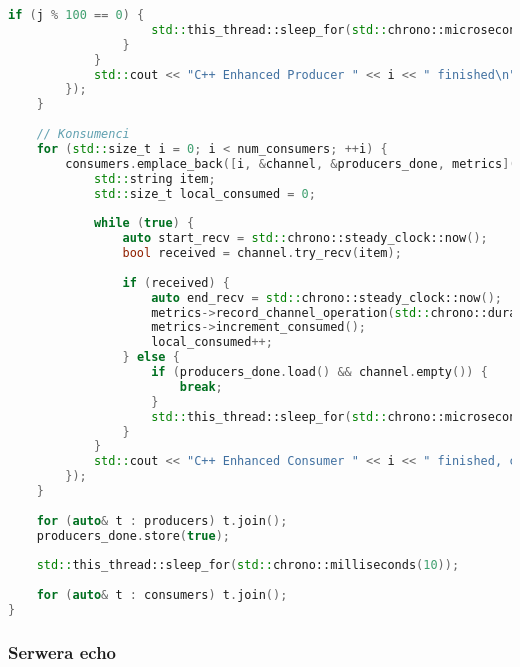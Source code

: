 \begin{lstlisting}[language=C++, caption={Producent-Konsument w C++ z Channel}, label={lst:cpp_producer_consumer}]
                if (j % 100 == 0) {
                    std::this_thread::sleep_for(std::chrono::microseconds(1));
                }
            }
            std::cout << "C++ Enhanced Producer " << i << " finished\n";
        });
    }
    
    // Konsumenci
    for (std::size_t i = 0; i < num_consumers; ++i) {
        consumers.emplace_back([i, &channel, &producers_done, metrics]() {
            std::string item;
            std::size_t local_consumed = 0;
            
            while (true) {
                auto start_recv = std::chrono::steady_clock::now();
                bool received = channel.try_recv(item);
                
                if (received) {
                    auto end_recv = std::chrono::steady_clock::now();
                    metrics->record_channel_operation(std::chrono::duration_cast<std::chrono::nanoseconds>(end_recv - start_recv));
                    metrics->increment_consumed();
                    local_consumed++;
                } else {
                    if (producers_done.load() && channel.empty()) {
                        break;
                    }
                    std::this_thread::sleep_for(std::chrono::microseconds(10));
                }
            }
            std::cout << "C++ Enhanced Consumer " << i << " finished, consumed " << local_consumed << " items\n";
        });
    }
    
    for (auto& t : producers) t.join();
    producers_done.store(true);
    
    std::this_thread::sleep_for(std::chrono::milliseconds(10));
    
    for (auto& t : consumers) t.join();
}
\end{lstlisting}

\subsubsection{Serwera echo}

